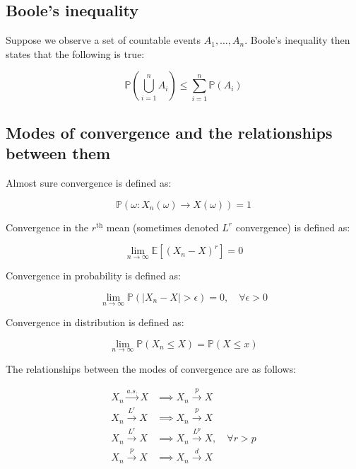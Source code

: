 \documentclass{report}
\begin{document}
\subsection{Boole's inequality}

Suppose we observe a set of countable events $A_1, \dots, A_n$. Boole's inequality then states that the following is true:

\begin{equation}\label{eq:lst-booles-inequality}
    \mathbb{P}\left(\bigcup_{i=1}^n A_i\right) \leq \sum_{i=1}^n \mathbb{P}(A_i)
\end{equation}

\subsection{Modes of convergence and the relationships between them}

Almost sure convergence is defined as:

\begin{equation}\label{eq:lst-convergence-as}
    \mathbb{P}(\omega: X_n(\omega) \to X(\omega)) = 1
\end{equation}

Convergence in the $r^\text{th}$ mean (sometimes denoted $L^r$ convergence) is defined as:

\begin{equation}\label{eq:lst-convergence-rth-mean}
    \lim_{n \to \infty} \mathbb{E}\left[(X_n - X)^r\right] = 0
\end{equation}

Convergence in probability is defined as:

\begin{equation}\label{eq:lst-convergence-probability}
    \lim_{n\to \infty} \mathbb{P}(|X_n - X| > \epsilon) = 0,\quad \forall \epsilon > 0
\end{equation}

Convergence in distribution is defined as:

\begin{equation}\label{eq:lst-convergence-distribution}
    \lim_{n\to \infty} \mathbb{P}(X_n \le X) = \mathbb{P}(X \le x)
\end{equation}

The relationships between the modes of convergence are as follows:

\begin{equation}\label{eq:lst-convergence-relationships}
    \begin{aligned}
      X_n \overset{a.s.}{\to} X &\implies X_n \overset{p}{\to} X \\
      X_n \overset{L^r}{\to} X &\implies X_n \overset{p}{\to} X \\
      X_n \overset{L^r}{\to} X &\implies X_n \overset{L^p}{\to} X, \quad \forall r > p \\
      X_n \overset{p}{\to} X &\implies X_n \overset{d}{\to} X \\
    \end{aligned}
\end{equation}
\end{document}
